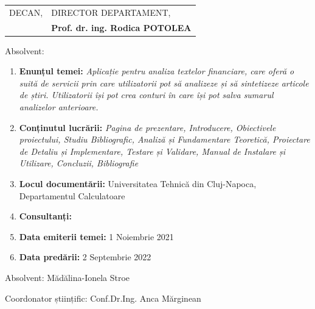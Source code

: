 \begin{tabular}{p{7cm}p{8cm}}
	\hspace{-1cm}DECAN, & DIRECTOR DEPARTAMENT,\\
	\hspace{-1cm}{\bf Prof. dr. ing. Liviu MICLEA} & {\bf Prof. dr. ing. Rodica POTOLEA}\\  
\end{tabular}

\vspace{2cm}

\begin{center}
	Absolvent: {\bf \thesisauthor}
	
	\vspace{1cm}
	
	{\bf \thesistitle}
\end{center}

\vspace{5mm}
\begin{enumerate}
	\item {\bf Enunțul temei:} {\it Aplicație pentru analiza textelor financiare, care oferă o suită de servicii prin care utilizatorii pot să analizeze și să sintetizeze articole de știri. 
	Utilizatorii își pot crea conturi în care își pot salva sumarul analizelor anterioare.}
	\item {\bf Conținutul lucrării:} {\it Pagina de prezentare, Introducere, Obiectivele proiectului, Studiu Bibliografic, Analiză și Fundamentare Teoretică, Proiectare de Detaliu și Implementare, Testare și Validare, Manual de Instalare și Utilizare, Concluzii, Bibliografie}
	\item {\bf Locul documentării:} Universitatea Tehnică din Cluj-Napoca, Departamentul Calculatoare
	\item {\bf Consultanți:}
	\item {\bf Data emiterii temei:} 1 Noiembrie 2021 %
	\item {\bf Data predării:} 2 Septembrie 2022 %
\end{enumerate}
\vspace{1.2cm}

\hspace{6cm} Absolvent: Mădălina-Ionela Stroe %

\vspace{0.5cm}
\hspace{5cm} Coordonator științific: Conf.Dr.Ing. Anca Mărginean %
\newpage
\begin{center}
	{\department}
\end{center}
\vspace{0.5cm}

